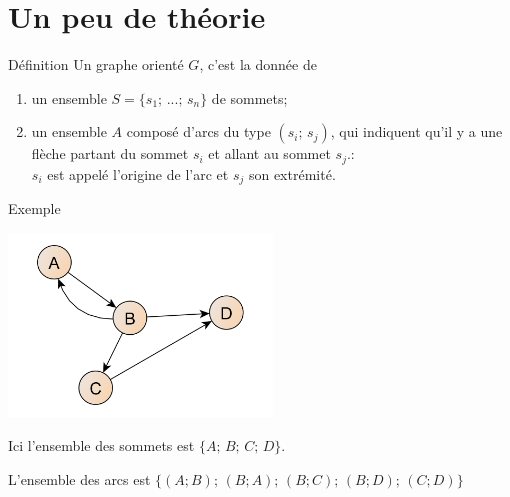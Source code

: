 \documentclass[10pt]{beamer}
\begin{document}
\section{Un peu de théorie}
\begin{frame}{Définition}
Un graphe orienté $G$, c'est la donnée de\pause
\begin{enumerate}[--]
	\item 	un ensemble $S=\{s_1;\,...;\,s_n\}$ de \alert{sommets};\pause
	\item 	un ensemble $A$ composé d'\alert{arcs} du type $(s_i;\,s_j)$, qui indiquent qu'il y a \og une flèche\fg{} partant du sommet $s_i$ et allant au sommet $s_j$.:\\ $s_i$ est appelé l'\alert{origine} de l'arc et $s_j$ son \alert{extrémité}.
\end{enumerate}
\end{frame}
\begin{frame}{Exemple}
\begin{center}
\includegraphics[width=7cm]{img/ex_graphe_oriente.png}
\end{center}
\pause
Ici l'ensemble des sommets est $\{A;\,B;\,C;\,D\}$.\\\pause

L'ensemble des arcs est $\{(A;B);\,(B;A);\,(B;C);\,(B;D);\,(C;D)\}$
\end{frame}
\end{document}
